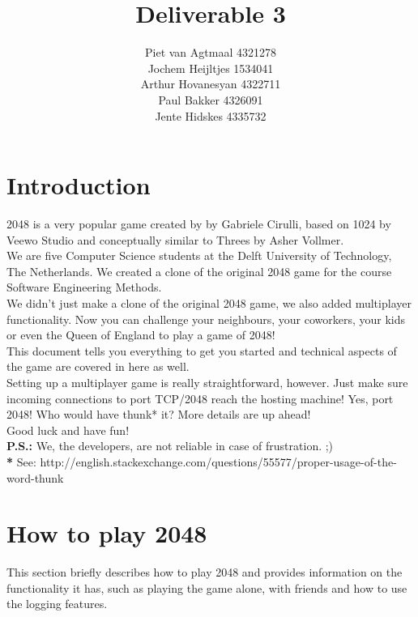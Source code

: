 \documentclass[a4paper,11pt,report]{scrartcl}
\title{\huge\textbf{Deliverable 3}}
\author{Piet van Agtmaal 4321278\\
	    Jochem Heijltjes 1534041\\
		Arthur Hovanesyan 4322711\\
		Paul Bakker 4326091\\
		Jente Hidskes 4335732
	   }
\begin{document}
\begin{titlepage}
\maketitle
\thispagestyle{empty} %
\end{titlepage}

\newpage\section{Introduction}

2048 is a very popular game created by by Gabriele Cirulli, based on 1024 by
Veewo Studio and conceptually similar to Threes by Asher Vollmer.\\

We are five Computer Science students at the Delft University of Technology,
The Netherlands. We created a clone of the original 2048 game for the course
Software Engineering Methods.\\

We didn't just make a clone of the original 2048 game, we also added
multiplayer functionality. Now you can challenge your neighbours, your
coworkers, your kids or even the Queen of England to play a game of 2048!\\

This document tells you everything to get you started and technical aspects of
the game are covered in here as well.\\

Setting up a multiplayer game is really straightforward, however. Just make sure incoming connections to port TCP/2048 reach the hosting machine! Yes, port 2048! Who would have thunk* it? More details are up ahead!\\

Good luck and have fun!\\

\textbf{P.S.:} We, the developers, are not reliable in case of frustration. ;)\\

\textbf{*} See: http://english.stackexchange.com/questions/55577/proper-usage-of-the-word-thunk

\newpage\section{How to play 2048}

This section briefly describes how to play 2048 and provides information on
the functionality it has, such as playing the game alone, with friends and how
to use the logging features.\\
\end{document}
